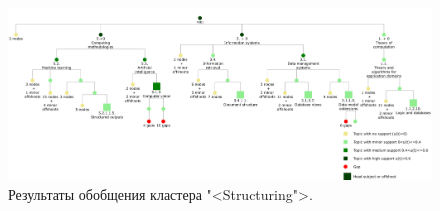 \documentclass[12pt]{article}
\begin{document}
\begin{figure}
	\centering
	\vspace{-2cm}
	\includegraphics[width=\textheight, angle=90, origin=c, clip]{images/cluster_lift_tree_06_structuring}
	\caption{Результаты обобщения кластера "<Structuring">.}
	\label{fig:tax_structuring}
\end{figure}
\end{document}
